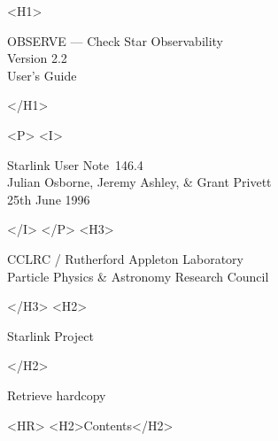 \documentclass[11pt]{article}
\newcommand{\stardoccategory}  {Starlink User Note}
\newcommand{\stardocsource}    {sun\stardocnumber}
\newcommand{\stardocnumber}    {146.4}
\newcommand{\stardocauthors}   {Julian Osborne, Jeremy Ashley, \& Grant Privett}
\newcommand{\stardocdate}      {25th June 1996}
\newcommand{\stardoctitle}     {OBSERVE --- Check Star Observability}
\newcommand{\stardocversion}   {Version 2.2}
\newcommand{\stardocmanual}    {User's Guide}
\newcommand{\htmladdnormallink}[2]{#1}
\newcommand{\htmladdimg}[1]{}
\newcommand{\htmlref}[2]{#1}
\newcommand{\htmladdtonavigation}[1]{}
\newcommand{\xlabel}[1]{}
\newcommand{\latexonlytoc}[0]{\tableofcontents}
\begin{document}
\begin{htmlonly}
   \xlabel{}
   \begin{rawhtml} <H1> \end{rawhtml}
      \stardoctitle\\
      \stardocversion\\
      \stardocmanual
   \begin{rawhtml} </H1> \end{rawhtml}


   \begin{rawhtml} <P> <I> \end{rawhtml}
   \stardoccategory\ \stardocnumber \\
   \stardocauthors \\
   \stardocdate
   \begin{rawhtml} </I> </P> <H3> \end{rawhtml}
      \htmladdnormallink{CCLRC}{http://www.cclrc.ac.uk} /
      \htmladdnormallink{Rutherford Appleton Laboratory}
                        {http://www.cclrc.ac.uk/ral} \\
      \htmladdnormallink{Particle Physics \& Astronomy Research Council}
                        {http://www.pparc.ac.uk} \\
   \begin{rawhtml} </H3> <H2> \end{rawhtml}
      \htmladdnormallink{Starlink Project}{http://star-www.rl.ac.uk/}
   \begin{rawhtml} </H2> \end{rawhtml}
   \htmladdnormallink{\htmladdimg{source.gif} Retrieve hardcopy}
      {http://star-www.rl.ac.uk/cgi-bin/hcserver?\stardocsource}\\

  \label{stardoccontents}
  \begin{rawhtml} 
    <HR>
    <H2>Contents</H2>
  \end{rawhtml}
  \renewcommand{\latexonlytoc}[0]{}
  \htmladdtonavigation{\htmlref{\htmladdimg{contents_motif.gif}}
        {stardoccontents}}

\end{htmlonly}
\end{document}
